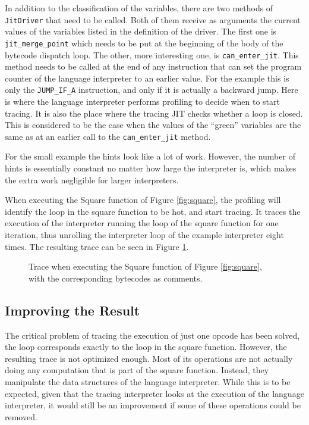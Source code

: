 \documentclass{sig-alternate}
\begin{document}
In addition to the classification of the variables, there are two methods of
\texttt{JitDriver} that need to be called. Both of them receive as arguments the
current values of the variables listed in the definition of the driver. The
first one is \texttt{jit\_merge\_point} which needs to be put at the beginning
of the body of the bytecode dispatch loop. The other, more interesting one, is
\texttt{can\_enter\_jit}. This method needs to be called at the end of any
instruction that can set the program counter of the language interpreter to an
earlier value. For the example this is only the \texttt{JUMP\_IF\_A}
instruction, and only if it is actually a backward jump. Here is
where the language interpreter performs profiling to decide
when to start tracing. It is also the place where the tracing JIT checks
whether a loop is closed. This is considered to be the case when the values of
the ``green'' variables are the same as at an earlier call to the
\texttt{can\_enter\_jit} method.

For the small example the hints look like a lot of work. However, the number of
hints is essentially constant no matter how large the interpreter is, which
makes the extra work negligible for larger interpreters.

When executing the Square function of Figure \ref{fig:square}, the profiling
will identify the loop in the square function to be hot, and start tracing. It
traces the execution of the interpreter running the loop of the square function
for one iteration, thus unrolling the interpreter loop of the example
interpreter eight times. The resulting trace can be seen in Figure 
\ref{fig:trace-no-green-folding}.

\begin{figure}

\caption{Trace when executing the Square function of Figure \ref{fig:square},
with the corresponding bytecodes as comments.}
\label{fig:trace-no-green-folding}
\end{figure}

\subsection{Improving the Result}

The critical problem of tracing the execution of just one opcode has been
solved, the loop corresponds exactly to the loop in the square function.
However, the resulting trace is not optimized enough. Most of its operations are not
actually doing any computation that is part of the square function. Instead,
they manipulate the data structures of the language interpreter. While this is
to be expected, given that the tracing interpreter looks at the execution of the
language interpreter, it would still be an improvement if some of these operations could
be removed.
\end{document}
